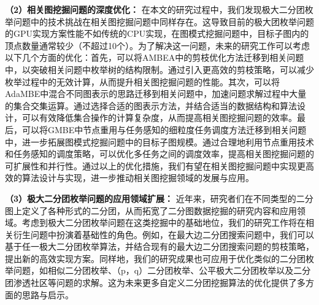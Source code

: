 \textbf{（2）相关图挖掘问题的深度优化：} 在本文的研究过程中，我们发现极大二分团枚举问题中的技术挑战在相关图挖掘问题中同样存在。这导致目前的极大团枚举问题的GPU实现方案性能不如传统的CPU实现，在图模式挖掘问题中，目标子图内的顶点数量通常较少（不超过10个）。为了解决这一问题，未来的研究工作可以考虑以下几个方面的优化：首先，可以将AMBEA中的剪枝优化方法迁移到相关问题中，以突破相关问题中枚举树的结构限制。通过引入更高效的剪枝策略，可以减少枚举过程中的无效计算，从而提升相关图挖掘问题的性能。其次，可以将AdaMBE中混合不同图表示的思路迁移到相关问题中，加速问题求解过程中大量的集合交集运算。通过选择合适的图表示方法，并结合适当的数据结构和算法设计，可以有效降低集合操作的计算复杂度，从而提高相关图挖掘问题的效率。最后，可以将GMBE中节点重用与任务感知的细粒度任务调度方法迁移到相关问题中，进一步拓展图模式挖掘问题中的目标子图规模。通过合理地利用节点重用技术和任务感知的调度策略，可以优化多任务之间的调度效率，提高相关图挖掘问题的可扩展性和并行性。通过以上的优化措施，我们有望在相关图挖掘问题中实现更高效的算法设计与实现，进一步推动相关图挖掘领域的发展与应用。

\textbf{（3）极大二分团枚举问题的应用领域扩展：} 近年来，研究者们在不同类型的二分图上定义了各种形式的二分团，从而拓宽了二分图数据挖掘的研究内容和应用领域。考虑到极大二分团枚举问题在这类挖掘中的基础地位，我们的研究工作将在相关衍生问题中扮演着基础性的角色。例如，在最大边二分团搜索问题中，我们可以基于任一极大二分团枚举算法，并结合现有的最大边二分团搜索问题的剪枝策略，提出新的高效实现方案。同样地，我们的研究成果也可应用于优化类似的二分团枚举问题，如相似二分团枚举、（p，q）二分团枚举、公平极大二分团枚举以及二分团渗透社区等问题的求解。这为未来更多自定义二分团挖掘算法的优化提供了多方面的思路与启示。